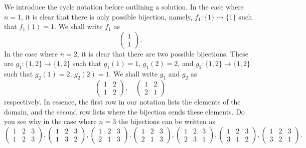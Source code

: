 We introduce the cycle notation before outlining a solution. In the case where $n=1$, it is clear that there is only possible bijection, namely, $f_1:\{1\}\to\{1\}$ such that $f_1 \left(1 \right) =1$. We shall write $f_1$ as \[
\begin{pmatrix}
	1 \\ 1
\end{pmatrix}
.\] In the case where $n=2$, it is clear that there are two possible bijections. These are $g_1:\{1,2\}\to \{1,2\}$ such that $g_1\left(1 \right) =1$, $g_1\left( 2 \right)=2$, and $g_{2}:\{1,2\}\to\{1,2\}$ such that $g_{2}\left(1  \right) =2$, $g_{2}\left( 2 \right) =1$. We shall write $g_{1}$ and $g_{2}$ as \[
\begin{pmatrix} 1 & 2 \\ 1 & 2 \end{pmatrix}, \quad \begin{pmatrix} 1 & 2 \\ 2 & 1 \end{pmatrix} 
\] respectively. In essence, the first row in our notation lists the elements of the domain, and the second row lists where the bijection sends these elements. Do you see why in the case where $n=3$ the bijections can be written as 
 \[
	 \begin{pmatrix} 1 & 2 & 3 \\ 1 & 2 & 3 \end{pmatrix}, \begin{pmatrix} 1 & 2 & 3 \\ 1 & 3 & 2 \end{pmatrix}, \begin{pmatrix} 1 & 2 & 3 \\ 2 & 1 & 3 \end{pmatrix}, \begin{pmatrix} 1 & 2 & 3 \\ 2 & 1 & 3 \end{pmatrix}, \begin{pmatrix} 1 & 2 & 3 \\ 2 & 3 & 1 \end{pmatrix}, \begin{pmatrix} 1 & 2 & 3 \\ 3 & 1 & 2\end{pmatrix}, \begin{pmatrix} 1 & 2 & 3 \\ 3 & 2 & 1 \end{pmatrix} 
.\]
